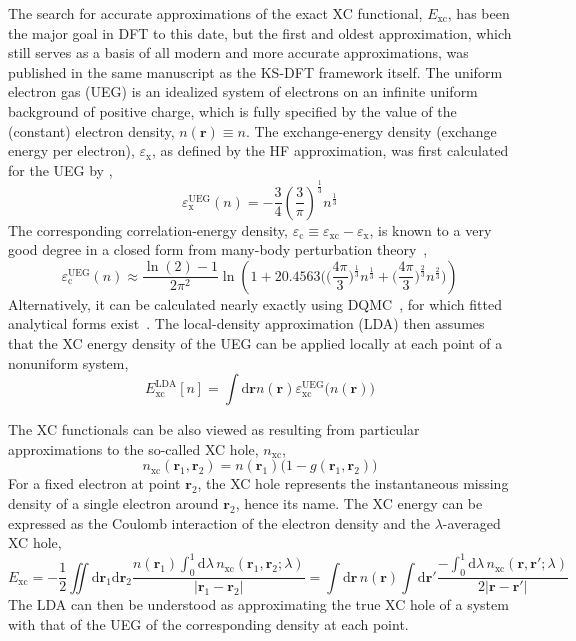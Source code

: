 The search for accurate approximations of the exact XC functional, $E_\text{xc}$, has been the major goal in DFT to this date, but the first and oldest approximation, which still serves as a basis of all modern and more accurate approximations, was published in the same manuscript as the KS-DFT framework itself.
The uniform electron gas (UEG) is an idealized system of electrons on an infinite uniform background of positive charge, which is fully specified by the value of the (constant) electron density, $n(\mathbf r)\equiv n$.
The exchange-energy density (exchange energy per electron), $\varepsilon_\text{x}$, as defined by the HF approximation, was first calculated for the UEG by \citet{DiracMPCPS30},
\begin{equation}
  \varepsilon_\text{x}^\text{UEG}(n)=-\frac34\left(\frac3\pi\right)^\frac13 n^\frac13
\end{equation}
The corresponding correlation-energy density, $\varepsilon_\text{c}\equiv\varepsilon_\text{xc}-\varepsilon_\text{x}$, is known to a very good degree in a closed form from many-body perturbation theory~\cite{ChachiyoJCP16},
\begin{equation}
  \varepsilon_\text{c}^\text{UEG}(n)\approx\frac{\ln(2)-1}{2\pi^2}\ln\left(1+20.4563\bigg(\!\Big(\frac{4\pi}3\Big)^\frac13n^\frac13+\Big(\frac{4\pi }3\Big)^\frac23n^\frac23\bigg)\!\right)
\end{equation}
Alternatively, it can be calculated nearly exactly using DQMC~\cite{CeperleyPRL80}, for which fitted analytical forms exist~\cite{PerdewPRB92}.
The local-density approximation (LDA) then assumes that the XC energy density of the UEG can be applied locally at each point of a nonuniform system,
\begin{equation}
  E_\text{xc}^\text{LDA}[n]=\int\mathrm d\mathbf r n(\mathbf r)\varepsilon_\text{xc}^\text{UEG}\big(n(\mathbf r)\!\big)
\end{equation}

The XC functionals can be also viewed as resulting from particular approximations to the so-called XC hole, $n_\text{xc}$,
\begin{equation}
  n_\text{xc}(\mathbf r_1,\mathbf r_2)=n(\mathbf r_1)\big(1-g(\mathbf r_1,\mathbf r_2)\!\big)
\end{equation}
For a fixed electron at point $\mathbf r_2$, the XC hole represents the instantaneous missing density of a single electron around $\mathbf r_2$, hence its name.
The XC energy can be expressed as the Coulomb interaction of the electron density and the $\lambda$-averaged XC hole,
\begin{equation}
E_\text{xc}=-\frac12\iint\mathrm d\mathbf r_1\mathrm d\mathbf r_2\frac{n(\mathbf r_1)\int_0^1\mathrm d\lambda\,n_\text{xc}(\mathbf r_1,\mathbf r_2;\lambda)}{|\mathbf r_1-\mathbf r_2|}=\int\mathrm d\mathbf r\,n(\mathbf r)\int\mathrm d\mathbf r'\frac{-\int_0^1\mathrm d\lambda\,n_\text{xc}(\mathbf r,\mathbf r';\lambda)}{2|\mathbf r-\mathbf r'|}
\end{equation}
The LDA can then be understood as approximating the true XC hole of a system with that of the UEG of the corresponding density at each point.

